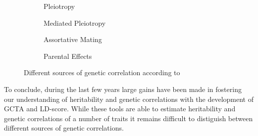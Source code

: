\begin{figure}[htp]
  \begin{subfigure}{0.5\textwidth}
    \resizebox{0.8\linewidth}{!}{} 
    \caption{Pleiotropy}\label{fig:pleiotropy}
  \end{subfigure}
  \begin{subfigure}{0.5\textwidth}
    \resizebox{0.8\linewidth}{!}{} 
    \caption{Mediated Pleiotropy}\label{fig:mediated_pleiotropy}
  \end{subfigure}
  \begin{subfigure}{0.5\textwidth}
    \resizebox{\linewidth}{!}{} 
    \caption{Assortative Mating}\label{fig:assortative_mating}
  \end{subfigure}
  \begin{subfigure}{0.5\textwidth}
    \resizebox{\linewidth}{!}{}
    \caption{Parental Effects}\label{fig:parental_effects}
  \end{subfigure}
  \caption{Different sources of genetic correlation according to~\citet{Pickrell2016}}\label{fig:genetic_correlation}
\end{figure}

To conclude, during the last few years large gains have been made in fostering our understanding of heritability and genetic correlations with the development of GCTA and LD-score.
While these tools are able to estimate heritability and genetic correlations of a number of traits it remains difficult to distiguish between different sources of genetic correlations.


